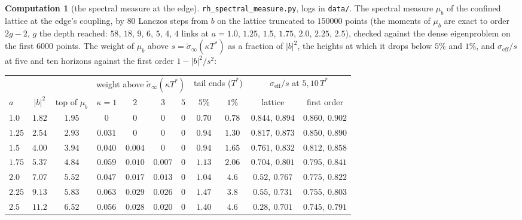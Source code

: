 \documentclass[11pt]{article}
\theoremstyle{definition}
\newtheorem{computation}[theorem]{Computation}
\theoremstyle{remark}
\newcommand{\Tst}{T^{*}}
\begin{document}
\begin{computation}[the spectral measure at the edge]\label{comp:spectral}
\texttt{rh\_spectral\_measure.py}, logs in \texttt{data/}. The spectral measure $\mu_b$ of the confined lattice at the edge's coupling, by $80$ Lanczos steps from $b$ on the lattice truncated to $150000$ points (the moments of $\mu_b$ are exact to order $2g-2$, $g$ the depth reached: $58$, $18$, $9$, $6$, $5$, $4$, $4$ links at $a=1.0$, $1.25$, $1.5$, $1.75$, $2.0$, $2.25$, $2.5$), checked against the dense eigenproblem on the first $6000$ points. The weight of $\mu_b$ above $s=\tilde\sigma_\infty(\kappa\Tst)$ as a fraction of $|b|^2$, the heights at which it drops below $5\%$ and $1\%$, and $\sigma_{\mathrm{eff}}/s$ at five and ten horizons against the first order $1-|b|^2/s^2$:
\begin{center}\scriptsize
\begin{tabular}{@{}lcccccccccc@{}}
\toprule
& & & \multicolumn{4}{c}{weight above $\tilde\sigma_\infty(\kappa\Tst)$} & \multicolumn{2}{c}{tail ends ($\Tst$)} & \multicolumn{2}{c}{$\sigma_{\mathrm{eff}}/s$ at $5,10\,\Tst$}\\
$a$ & $|b|^2$ & top of $\mu_b$ & $\kappa=1$ & $2$ & $3$ & $5$ & $5\%$ & $1\%$ & lattice & first order\\
\midrule
$1.0$ & $1.82$ & $1.95$ & $0$ & $0$ & $0$ & $0$ & $0.70$ & $0.78$ & $0.844,\ 0.894$ & $0.860,\ 0.902$\\
$1.25$ & $2.54$ & $2.93$ & $0.031$ & $0$ & $0$ & $0$ & $0.94$ & $1.30$ & $0.817,\ 0.873$ & $0.850,\ 0.890$\\
$1.5$ & $4.00$ & $3.94$ & $0.040$ & $0.004$ & $0$ & $0$ & $0.94$ & $1.65$ & $0.761,\ 0.832$ & $0.812,\ 0.858$\\
$1.75$ & $5.37$ & $4.84$ & $0.059$ & $0.010$ & $0.007$ & $0$ & $1.13$ & $2.06$ & $0.704,\ 0.801$ & $0.795,\ 0.841$\\
$2.0$ & $7.07$ & $5.52$ & $0.047$ & $0.017$ & $0.013$ & $0$ & $1.04$ & $4.6$ & $0.52,\ 0.767$ & $0.775,\ 0.822$\\
$2.25$ & $9.13$ & $5.83$ & $0.063$ & $0.029$ & $0.026$ & $0$ & $1.47$ & $3.8$ & $0.55,\ 0.731$ & $0.755,\ 0.803$\\
$2.5$ & $11.2$ & $6.52$ & $0.056$ & $0.028$ & $0.020$ & $0$ & $1.40$ & $4.6$ & $0.28,\ 0.701$ & $0.745,\ 0.791$\\
\bottomrule
\end{tabular}
\end{center}

\end{computation}
\end{document}
